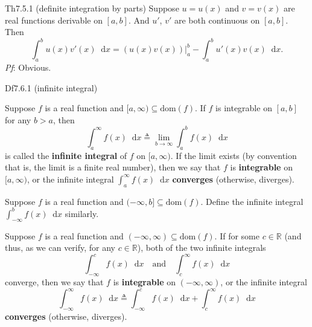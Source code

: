 \documentclass{article}
\newcommand{\dif}{\mathop{}\!\mathrm{d}}
\begin{document}
\begin{Th}{Th7.5.1 (definite integration by parts)}
    Suppose $u = u(x)$ and $v = v(x)$ are real functions derivable on $[a, b]$. And $u'$, $v'$ are both continuous on $[a, b]$. Then
    $$\int_a^b u(x)v'(x)\dif x = \left(u(x)v(x)\right)\Big|_a^b - \int_a^b u'(x)v(x)\dif x.$$
    \tcblower
    \textit{Pf}: Obvious.
\end{Th}

\begin{Df}{Df7.6.1 (infinite integral)}
    \begin{compactenum}
        \item Suppose $f$ is a real function and $[a, \infty)\subseteq\text{dom}(f)$. If $f$ is integrable on $[a, b]$ for any $b>a$, then 
        $$\int_a^\infty f(x)\dif x \triangleq \lim_{b\to\infty}\int_a^b f(x)\dif x$$
        is called the \textbf{infinite integral} of $f$ on $[a, \infty)$. If the limit exists (by convention that is, the limit is a finite real number), then we say that $f$ is \textbf{integrable} on $[a, \infty)$, or the infinite integral $\int_a^\infty f(x)\dif x$ \textbf{converges} (otherwise, diverges).
        \item Suppose $f$ is a real function and $(-\infty, b]\subseteq\text{dom}(f)$. Define the infinite integral $\int_{-\infty}^b f(x)\dif x$ similarly.
        \item Suppose $f$ is a real function and $(-\infty, \infty)\subseteq\text{dom}(f)$. If for some $c\in\mathbb{R}$ (\textcolor{Th}{and thus, as we can verify, for any $c\in\mathbb{R}$}), both of the two infinite integrals
        $$ \int_{-\infty}^c f(x)\dif x \quad \text{and} \quad \int_c^\infty f(x)\dif x $$
        converge, then we say that $f$ is \textbf{integrable} on $(-\infty, \infty)$, or the infinite integral 
        $$\int_{-\infty}^\infty f(x)\dif x \triangleq \int_{-\infty}^c f(x)\dif x + \int_c^\infty f(x)\dif x$$
        \textbf{converges} (otherwise, diverges).
    \end{compactenum}
\end{Df}
\end{document}
